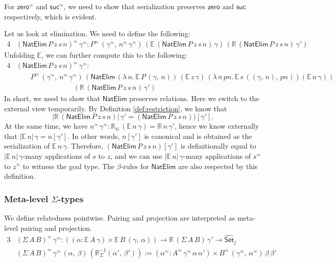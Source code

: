 \documentclass[acmsmall,review]{acmart}
\newcommand{\mit}[1]{\mathit{#1}}
\newcommand{\msf}[1]{\mathsf{#1}}
\newcommand{\mbb}[1]{\mathbb{#1}}
\newcommand{\wh}[1]{\widehat{#1}}
\newcommand{\zero}{\msf{zero}}
\newcommand{\suc}{\msf{suc}}
\newcommand{\Set}{\mathsf{Set}}
\newcommand{\ev}{\mbb{E}}
\newcommand{\re}{\mbb{R}}
\theoremstyle{remark}
\newcommand{\whset}{\wh{\Set}}
\newcommand{\rel}{^{\approx}}
\begin{document}
For $\zero\rel$ and $\suc\rel$, we need to show that serialization preserves
$\zero$ and $\suc$ respectively, which is evident.

Let us look at elimination. We need to define the following:
\begin{alignat*}{4}
  &(\msf{NatElim}\,P\,z\,s\,n)\rel\,\gamma\rel :
  P\rel\,(\gamma\rel,\,n\rel\,\gamma\rel)\,(\ev\,(\msf{NatElim}\,P\,z\,s\,n)\,\gamma)\,
                                           (\re\,(\msf{NatElim}\,P\,z\,s\,n)\,\gamma')
\end{alignat*}
Unfolding $\ev$, we can further compute this to the following:
\begin{alignat*}{4}
  &(\msf{NatElim}\,P\,z\,s\,n)\rel\,\gamma\rel : \\
  &\hspace{2em}P\rel\,(\gamma\rel,\,n\rel\,\gamma\rel)\,
  (\msf{NatElim}\,(\lambda\,n.\,\ev\,P\,(\gamma,\,n))\,
                  (\ev\,z\,\gamma)\,
                  (\lambda\,n\,\mit{pn}.\,\ev\,s\,((\gamma,\,n),\,\mit{pn}))
                  (\ev\,n\,\gamma))\\
  &\hspace{8em}(\re\,(\msf{NatElim}\,P\,z\,s\,n)\,\gamma')
\end{alignat*}
In short, we need to show that $\msf{NatElim}$ preserves relations. Here we
switch to the external view temporarily. By Definition \ref{def:restriction}, we know that
\[
   |\re\,(\msf{NatElim}\,P\,z\,s\,n)|\,\gamma' = (\msf{NatElim}\,P\,z\,s\,n))[\gamma'].
\]
At the same time, we have $n\rel\,\gamma\rel : \re_{\mbb{N}}\,(\ev\,n\,\gamma) =
\re\,n\,\gamma'$, hence we know externally that $|\ev\,n|\,\gamma = n[\gamma']$.
In other words, $n[\gamma']$ is canonical and is obtained as the serialization
of $\ev\,n\,\gamma$. Therefore, $(\msf{NatElim}\,P\,z\,s\,n)[\gamma']$ is
definitionally equal to $|\ev\,n|\,\gamma$-many applications of $s$ to
$z$, and we can use $|\ev\,n|\,\gamma$-many applications of $s\rel$ to $z\rel$
to witness the goal type. The $\beta$-rules for $\msf{NatElim}$ are also respected
by this definition.

\subsubsection{Meta-level $\Sigma$-types} We define relatedness pointwise. Pairing and projection
are interpreted as meta-level pairing and projection.
\begin{alignat*}{3}
  &(\Sigma\,A\,B)\rel\,\gamma\rel : ((\alpha : \ev\,A\,\gamma) \times \ev\,B\,(\gamma,\,\alpha))
             \to \re\,(\Sigma\,A\,B)\,\gamma' \to \whset_j\\
  &(\Sigma\,A\,B)\rel\,\gamma\rel\,(\alpha,\,\beta)\,(\re_{\Sigma}^{-1}(\alpha',\,\beta')) :=
             (\alpha\rel : A\rel\,\gamma\rel\,\alpha\,\alpha') \times B\rel\,(\gamma\rel,\,\alpha\rel)\,\beta\,\beta'
\end{alignat*}
\end{document}
